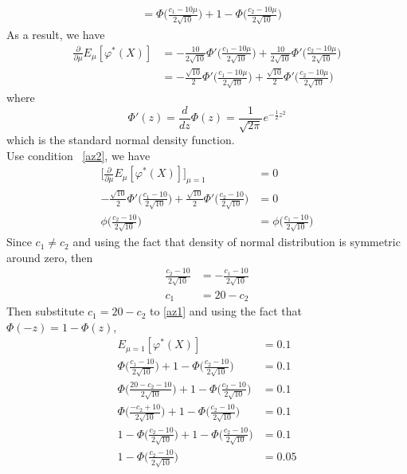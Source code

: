 \documentclass[a4paper,11pt]{article}
\begin{document}
\begin{enumerate}[(a)]
\begin{align*}
			&= \Phi\bigg( \frac{c_1-10\mu}{2\sqrt{10}}\bigg) +1 - \Phi \bigg(  \frac{c_2-10\mu}{2\sqrt{10}}\bigg)
		\end{align*}
	As a result, we have
		\begin{align*}
			\frac{\partial}{\partial\mu}E_{\mu}[\varphi^*(X)] &= -\frac{10}{2\sqrt{10}} \Phi'\bigg( \frac{c_1-10\mu}{2\sqrt{10}}\bigg)+ \frac{10}{2\sqrt{10}} \Phi'\bigg(  \frac{c_2-10\mu}{2\sqrt{10}}\bigg)\\
			&= -\frac{\sqrt{10}}{2} \Phi'\bigg( \frac{c_1-10\mu}{2\sqrt{10}}\bigg)+ \frac{\sqrt{10}}{2}\Phi'\bigg(  \frac{c_2-10\mu}{2\sqrt{10}}\bigg)
		\end{align*}
	where
		\[
			\Phi'(z) = \frac{d}{dz}\Phi(z) =\frac{1}{\sqrt{2\pi}} e^{-\frac{1}{2}z^2} 
		\]
	which is the standard normal density function.\\
	Use condition ~\eqref{az2}, we have 
		\begin{align*}
			\bigg[ \frac{\partial}{\partial\mu}E_{\mu}[\varphi^*(X)]\bigg]_{\mu=1} &= 0\\
			-\frac{\sqrt{10}}{2} \Phi'\bigg( \frac{c_1-10}{2\sqrt{10}}\bigg)+ \frac{\sqrt{10}}{2}\Phi'\bigg(  \frac{c_2-10}{2\sqrt{10}}\bigg)&=0\\
			\phi\bigg(  \frac{c_2-10}{2\sqrt{10}}\bigg)&=\phi\bigg( \frac{c_1-10}{2\sqrt{10}}\bigg)
		\end{align*}
	Since $c_1 \ne c_2$ and using the fact that density of normal distribution is symmetric around zero, then
		\begin{align*}
			\frac{c_2-10}{2\sqrt{10}}&= -\frac{c_1-10}{2\sqrt{10}}\\
			c_1 &=  20 -c_2
		\end{align*}
	Then substitute $c_1 =  20 -c_2$ to \eqref{az1} and using the fact that $\Phi(-z) = 1- \Phi(z)$,
		\begin{align*}
			E_{\mu=1}[\varphi^*(X)] &= 0.1\\
			\Phi\bigg( \frac{c_1-10}{2\sqrt{10}}\bigg) +1 - \Phi \bigg(  \frac{c_2-10}{2\sqrt{10}}\bigg)  &= 0.1\\
			\Phi\bigg( \frac{ 20 -c_2-10}{2\sqrt{10}}\bigg) +1 - \Phi \bigg(  \frac{c_2-10}{2\sqrt{10}}\bigg) &= 0.1\\
			\Phi\bigg( \frac{  -c_2+10}{2\sqrt{10}}\bigg) +1 - \Phi \bigg(  \frac{c_2-10}{2\sqrt{10}}\bigg) &= 0.1\\
			1-\Phi\bigg( \frac{  c_2-10}{2\sqrt{10}}\bigg) +1 - \Phi \bigg(  \frac{c_2-10}{2\sqrt{10}}\bigg) &= 0.1\\
			1- \Phi \bigg(  \frac{c_2-10}{2\sqrt{10}}\bigg) &= 0.05\\

\end{align*}
\end{enumerate}
\end{document}
